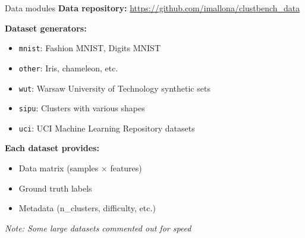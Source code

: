 \documentclass[aspectratio=169]{beamer}
\begin{document}
\begin{frame}{Data modules}
    \textbf{Data repository:} \url{https://github.com/imallona/clustbench_data}
    
    \vspace{0.3cm}
    \textbf{Dataset generators:}
    \begin{itemize}
        \item \texttt{mnist}: Fashion MNIST, Digits MNIST
        \item \texttt{other}: Iris, chameleon, etc.
        \item \texttt{wut}: Warsaw University of Technology synthetic sets
        \item \texttt{sipu}: Clusters with various shapes
        \item \texttt{uci}: UCI Machine Learning Repository datasets
    \end{itemize}
    
    \vspace{0.3cm}
    \textbf{Each dataset provides:}
    \begin{itemize}
        \item Data matrix (samples × features)
        \item Ground truth labels
        \item Metadata (n\_clusters, difficulty, etc.)
    \end{itemize}
    
    \vspace{0.3cm}
    \textit{Note: Some large datasets commented out for speed}
\end{frame}
\end{document}
